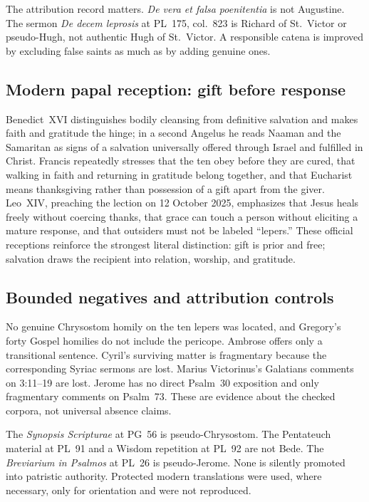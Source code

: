 The attribution record matters. \emph{De vera et falsa poenitentia} is not
Augustine. The sermon \emph{De decem leprosis} at PL~175, col.~823 is Richard
of St.~Victor or pseudo-Hugh, not authentic Hugh of St.~Victor. A responsible
catena is improved by excluding false saints as much as by adding genuine
ones.

\subsection*{Modern papal reception: gift before response}

Benedict~XVI distinguishes bodily cleansing from definitive salvation and
makes faith and gratitude the hinge; in a second Angelus he reads Naaman and
the Samaritan as signs of a salvation universally offered through Israel and
fulfilled in Christ. Francis repeatedly stresses that the ten obey before
they are cured, that walking in faith and returning in gratitude belong
together, and that Eucharist means thanksgiving rather than possession of a
gift apart from the giver. Leo~XIV, preaching the lection on 12 October 2025,
emphasizes that Jesus heals freely without coercing thanks, that grace can
touch a person without eliciting a mature response, and that outsiders must
not be labeled ``lepers.'' These official receptions reinforce the strongest
literal distinction: gift is prior and free; salvation draws the recipient
into relation, worship, and gratitude.

\subsection*{Bounded negatives and attribution controls}

No genuine Chrysostom homily on the ten lepers was located, and Gregory's
forty Gospel homilies do not include the pericope. Ambrose offers only a
transitional sentence. Cyril's surviving matter is fragmentary because the
corresponding Syriac sermons are lost. Marius Victorinus's Galatians comments
on 3:11--19 are lost. Jerome has no direct Psalm~30 exposition and only
fragmentary comments on Psalm~73. These are evidence about the checked corpora,
not universal absence claims.

The \emph{Synopsis Scripturae} at PG~56 is pseudo-Chrysostom. The Pentateuch
material at PL~91 and a Wisdom repetition at PL~92 are not Bede. The
\emph{Breviarium in Psalmos} at PL~26 is pseudo-Jerome. None is silently
promoted into patristic authority. Protected modern translations were used,
where necessary, only for orientation and were not reproduced.
